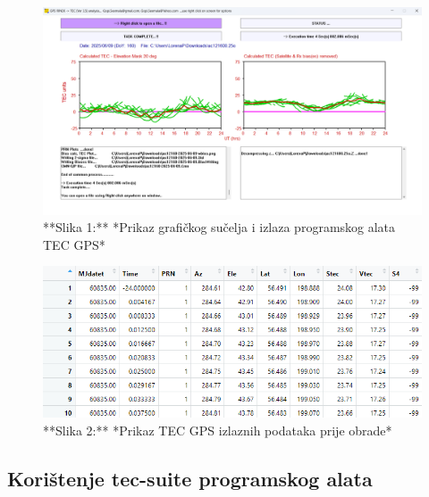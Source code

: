 \documentclass[
]{article}
\begin{document}
\begin{figure}

{\centering \includegraphics[width=25.03in]{./slike/tecgps-gui} 

}

\caption{**Slika 1:** *Prikaz grafičkog sučelja i izlaza programskog alata TEC GPS*}\label{fig:tecgps-gui}
\end{figure}

\begin{figure}

{\centering \includegraphics[width=0.7\linewidth]{./slike/tecgps-data} 

}

\caption{**Slika 2:** *Prikaz TEC GPS izlaznih podataka prije obrade*}\label{fig:tecgps-data}
\end{figure}

\subsection{Korištenje tec-suite programskog
alata}\label{koriux161tenje-tec-suite-programskog-alata}
\end{document}
